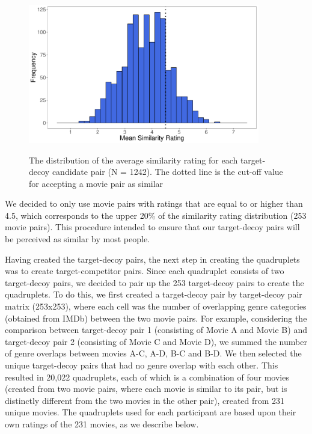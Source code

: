 \documentclass[12pt, a4paper]{article}
\begin{document}
\begin{figure}[htb!]
\centering
\captionsetup{justification=centering}
		\caption{The distribution of the average similarity rating for each target-decoy candidate pair (N = 1242). The dotted line is the cut-off value for accepting a movie pair as similar}
\includegraphics[width=0.9\textwidth]{figure2.pdf}
\label{fig:exp2_pilot}
\end{figure}

We decided to only use movie pairs with ratings that are equal to or higher than 4.5, which corresponds to the upper 20\% of the similarity rating distribution (253 movie pairs). This procedure intended to ensure that our target-decoy pairs will be perceived as similar by most people.

Having created the target-decoy pairs, the next step in creating the quadruplets was to create target-competitor pairs. Since each quadruplet consists of two target-decoy pairs, we decided to pair up the 253 target-decoy pairs to create the quadruplets. To do this, we first created a target-decoy pair by target-decoy pair matrix (253x253), where each cell was the number of overlapping genre categories (obtained from IMDb) between the two movie pairs. For example, considering the comparison between target-decoy pair 1 (consisting of Movie A and Movie B) and target-decoy pair 2 (consisting of Movie C and Movie D), we summed the number of genre overlaps between movies A-C, A-D, B-C and B-D. We then selected the unique target-decoy pairs that had no genre overlap with each other. This resulted in 20,022 quadruplets, each of which is a combination of four movies (created from two movie pairs, where each movie is similar to its pair, but is distinctly different from the two movies in the other pair), created from 231 unique movies. The quadruplets used for each participant are based upon their own ratings of the 231 movies, as we describe below.
\end{document}
